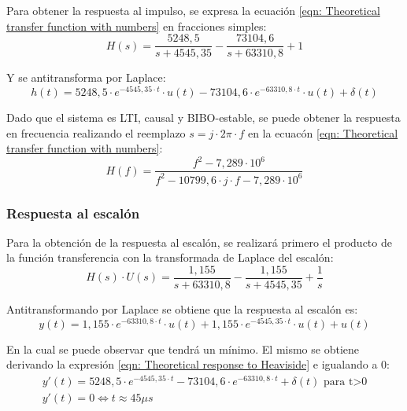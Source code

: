 Para obtener la respuesta al impulso, se expresa la ecuaci\'on \ref{eqn: Theoretical transfer function with numbers} en fracciones simples:
\begin{equation}
    H(s) = \frac{5248,5}{s+4545,35} - \frac{73104,6}{s+63310,8} + 1
\end{equation}

Y se antitransforma por Laplace:
\begin{equation}
    \label{eqn: Theoretical impulse response}
    h(t) = 5248,5 \cdot e^{-4545,35 \cdot t} \cdot u(t) - 73104,6 \cdot e^{-63310,8 \cdot t} \cdot u(t) + \delta(t)
\end{equation}

Dado que el sistema es LTI, causal y BIBO-estable, se puede obtener la respuesta en frecuencia realizando el reemplazo $s = j \cdot 2\pi \cdot f$ en la ecuac\'on \ref{eqn: Theoretical transfer function with numbers}:
\begin{equation}
    \label{eqn: Theoretical frequency response}
    H(f) = \frac{f^2 - 7,289 \cdot 10^6}{f^2 - 10799,6 \cdot j \cdot f - 7,289 \cdot 10^6}
\end{equation}



\subsubsection{Respuesta al escal\'on} \label{sec: Response to step}
Para la obtenci\'on de la respuesta al escal\'on, se realizar\'a primero el producto de la funci\'on transferencia con la transformada de Laplace del escal\'on:
\begin{equation}
    H(s) \cdot U(s) = \frac{1,155}{s+63310,8} - \frac{1,155}{s+4545,35} + \frac{1}{s}
\end{equation} 

Antitransformando por Laplace se obtiene que la respuesta al escal\'on es:
\begin{equation}
    \label{eqn: Theoretical response to Heaviside}
    y(t) = 1,155 \cdot e^{-63310,8 \cdot t} \cdot u(t) + 1,155 \cdot e^{-4545,35 \cdot t} \cdot u(t) + u(t)
\end{equation}

En la cual se puede observar que tendr\'a un m\'inimo. El mismo se obtiene derivando la expresi\'on \ref{eqn: Theoretical response to Heaviside} e igualando a 0:
\begin{align}
    y'(t) = 5248,5 \cdot e^{-4545,35 \cdot t} - 73104,6 \cdot e^{-63310,8 \cdot t} + \delta(t)\textrm{      para t>0} \\
    y'(t) = 0 \iff t \approx 45 \mu s
\end{align}



